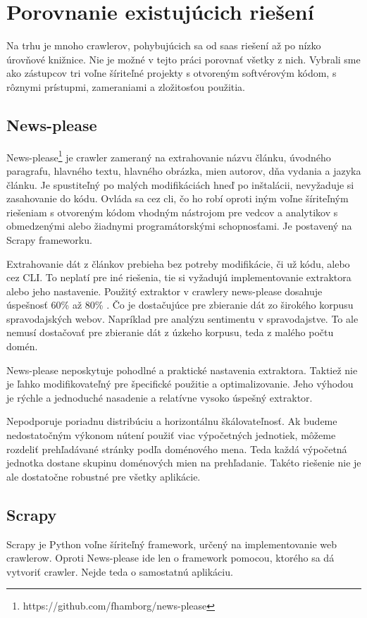 \section{Porovnanie existujúcich riešení}
Na trhu je mnoho crawlerov, pohybujúcich sa od \acrshort{saas} riešení až po nízko úrovňové knižnice. Nie je možné v tejto práci porovnať všetky z nich. Vybrali sme ako zástupcov tri voľne šíriteľné projekty s otvoreným softvérovým kódom, s rôznymi prístupmi, zameraniami a zložitosťou použitia.

\subsection{News-please}
News-please\footnote{https://github.com/fhamborg/news-please} je crawler zameraný na extrahovanie názvu článku, úvodného paragrafu, hlavného textu, hlavného obrázka, mien autorov, dňa vydania a jazyka článku. Je spustiteľný po malých modifikáciách hneď po inštalácii, nevyžaduje si zasahovanie do kódu. Ovláda sa cez \acrshort{cli}, čo ho robí oproti iným voľne šíriteľným riešeniam s otvoreným kódom vhodným nástrojom pre vedcov a analytikov s obmedzenými alebo žiadnymi programátorskými schopnosťami. Je postavený na Scrapy frameworku. 

Extrahovanie dát z článkov prebieha bez potreby modifikácie, či už kódu, alebo cez CLI. To neplatí pre iné riešenia, tie si vyžadujú implementovanie extraktora alebo jeho nastavenie. Použitý extraktor v crawlery news-please dosahuje úspešnosť 60\% až 80\% \cite{newsPlease}. Čo je dostačujúce pre zbieranie dát zo širokého korpusu spravodajských webov. Napríklad pre analýzu sentimentu v spravodajstve. To ale nemusí dostačovať pre zbieranie dát z úzkeho korpusu, teda z malého počtu domén. 

News-please neposkytuje pohodlné a praktické nastavenia extraktora. Taktiež nie je ľahko modifikovateľný pre špecifické použitie a optimalizovanie. Jeho výhodou je rýchle a jednoduché nasadenie a relatívne vysoko úspešný extraktor. 

Nepodporuje poriadnu distribúciu a horizontálnu škálovateľnosť. Ak budeme nedostatočným výkonom nútení použiť viac výpočetných jednotiek, môžeme rozdeliť prehľadávané stránky podľa doménového mena. Teda každá výpočetná jednotka dostane skupinu doménových mien na prehľadanie. Takéto riešenie nie je ale dostatočne robustné pre všetky aplikácie. 

\subsection{Scrapy} 
Scrapy je Python voľne šíriteľný framework, určený na implementovanie web crawlerow. Oproti News-please ide len o framework pomocou, ktorého sa dá vytvoriť crawler. Nejde teda o samostatnú aplikáciu. 

